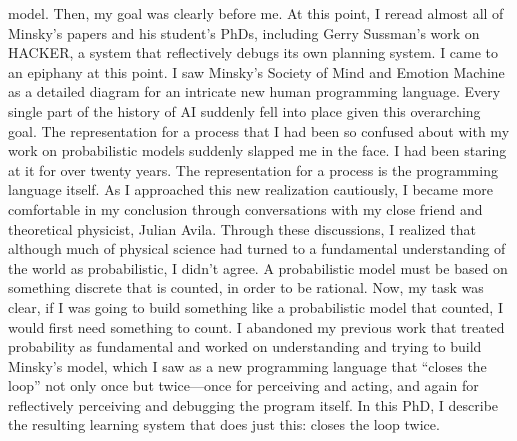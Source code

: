 model.  Then, my goal was clearly before me.  At this point, I reread
almost all of Minsky's papers and his student's PhDs, including Gerry
Sussman's work on HACKER, a system that reflectively debugs its own
planning system.  I came to an epiphany at this point.  I saw Minsky's
Society of Mind and Emotion Machine as a detailed diagram for an
intricate new human programming language.  Every single part of the
history of AI suddenly fell into place given this overarching goal.
The representation for a process that I had been so confused about
with my work on probabilistic models suddenly slapped me in the face.
I had been staring at it for over twenty years.  The representation
for a process is the programming language itself.  As I approached
this new realization cautiously, I became more comfortable in my
conclusion through conversations with my close friend and theoretical
physicist, Julian Avila.  Through these discussions, I realized that
although much of physical science had turned to a fundamental
understanding of the world as probabilistic, I didn't agree.  A
probabilistic model must be based on something discrete that is
counted, in order to be rational.  Now, my task was clear, if I was
going to build something like a probabilistic model that counted, I
would first need something to count.  I abandoned my previous work
that treated probability as fundamental and worked on understanding
and trying to build Minsky's model, which I saw as a new programming
language that ``closes the loop'' not only once but twice---once for
perceiving and acting, and again for reflectively perceiving and
debugging the program itself.  In this PhD, I describe the resulting
learning system that does just this: closes the loop twice.

